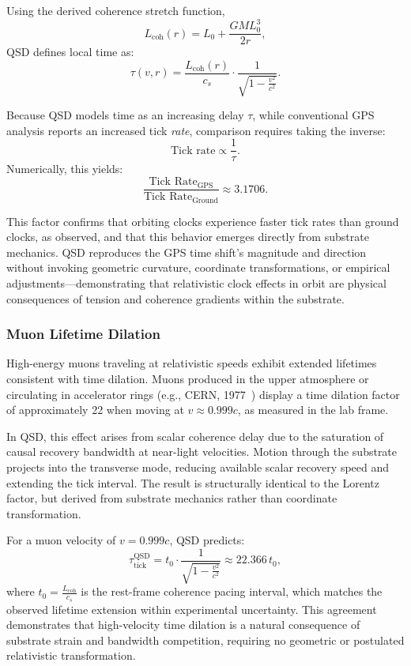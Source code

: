 \documentclass[entropy,article,submit,pdftex,moreauthors]{Definitions/mdpi}
\begin{document}
Using the derived coherence stretch function,
\[
L_{\text{coh}}(r) = L_0 + \frac{GM L_0^3}{2r},
\]
QSD defines local time as:
\[
\tau(v, r) =
\frac{L_{\text{coh}}(r)}{c_s}
\cdot \frac{1}{\sqrt{1 - \frac{v^2}{c^2}}}.
\]

Because QSD models time as an increasing delay \( \tau \), while conventional GPS analysis reports an increased tick \textit{rate}, comparison requires taking the inverse:
\[
\text{Tick rate} \propto \frac{1}{\tau}.
\]
Numerically, this yields:
\[
\frac{\text{Tick Rate}_{\text{GPS}}}{\text{Tick Rate}_{\text{Ground}}} \approx 3.1706.
\]

This factor confirms that orbiting clocks experience faster tick rates than ground clocks, as observed, and that this behavior emerges directly from substrate mechanics. QSD reproduces the GPS time shift's magnitude and direction without invoking geometric curvature, coordinate transformations, or empirical adjustments—demonstrating that relativistic clock effects in orbit are physical consequences of tension and coherence gradients within the substrate.

\subsubsection{Muon Lifetime Dilation}

High-energy muons traveling at relativistic speeds exhibit extended lifetimes consistent with time dilation. Muons produced in the upper atmosphere or circulating in accelerator rings (e.g., CERN, 1977~\cite{bailey-muon}) display a time dilation factor of approximately 22 when moving at \( v \approx 0.999c \), as measured in the lab frame.

In QSD, this effect arises from scalar coherence delay due to the saturation of causal recovery bandwidth at near-light velocities. Motion through the substrate projects into the transverse mode, reducing available scalar recovery speed and extending the tick interval. The result is structurally identical to the Lorentz factor, but derived from substrate mechanics rather than coordinate transformation.

For a muon velocity of \( v = 0.999c \), QSD predicts:
\[
\tau_{\text{tick}}^{\text{QSD}} = t_0 \cdot \frac{1}{\sqrt{1 - \frac{v^2}{c^2}}} \approx 22.366 \, t_0,
\]
where \( t_0 = \frac{L_{\text{coh}}}{c_s} \) is the rest-frame coherence pacing interval, which matches the observed lifetime extension within experimental uncertainty. This agreement demonstrates that high-velocity time dilation is a natural consequence of substrate strain and bandwidth competition, requiring no geometric or postulated relativistic transformation.
\end{document}
